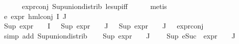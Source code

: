 \begin{isabellebody}
\ \ \ \ \ \ expr{\isacharunderscore}{\kern0pt}{}{\isacharunderscore}{\kern0pt}conj\ Sup{\isacharunderscore}{\kern0pt}union{\isacharunderscore}{\kern0pt}distrib\ le{\isacharunderscore}{\kern0pt}sup{\isacharunderscore}{\kern0pt}iff\isanewline
\ \ \ \ \isamarkupfalse%
\ metis\isanewline
\ \ \isamarkupfalse%
\ e{}{\isacharcolon}{\kern0pt}\ {\isachardoublequoteopen}expr{\isacharunderscore}{\kern0pt}{}\ {\isacharparenleft}{\kern0pt}hml{\isacharunderscore}{\kern0pt}conj\ I\ J\ {\isasymPhi}{\isacharparenright}{\kern0pt}\ {\isasymle}\ {}{\isachardoublequoteclose}\ \isanewline
\ \ \ \ \isamarkupfalse%
\ {\isacartoucheopen}Sup\ {\isacharparenleft}{\kern0pt}{\isacharparenleft}{\kern0pt}expr{\isacharunderscore}{\kern0pt}{}\ {\isasymcirc}\ {\isasymPhi}{\isacharparenright}{\kern0pt}\ {\isacharbackquote}{\kern0pt}\ I{\isacharparenright}{\kern0pt}\ {\isasymle}\ {}{\isacartoucheclose}\ {\isacartoucheopen}Sup\ {\isacharparenleft}{\kern0pt}{\isacharparenleft}{\kern0pt}expr{\isacharunderscore}{\kern0pt}{}\ {\isasymcirc}\ {\isasymPhi}{\isacharparenright}{\kern0pt}\ {\isacharbackquote}{\kern0pt}\ J{\isacharparenright}{\kern0pt}\ {\isasymle}\ {}{\isacartoucheclose}\ {\isacartoucheopen}Sup\ {\isacharparenleft}{\kern0pt}{\isacharparenleft}{\kern0pt}expr{\isacharunderscore}{\kern0pt}{}\ {\isasymcirc}\ {\isasymPhi}{\isacharparenright}{\kern0pt}\ {\isacharbackquote}{\kern0pt}\ J{\isacharparenright}{\kern0pt}\ {\isasymle}\ {}{\isacartoucheclose}\ expr{\isacharunderscore}{\kern0pt}{}{\isacharunderscore}{\kern0pt}conj\ \isanewline
\ \ \ \ \isamarkupfalse%
\ {\isacharparenleft}{\kern0pt}simp\ add{\isacharcolon}{\kern0pt}\ Sup{\isacharunderscore}{\kern0pt}union{\isacharunderscore}{\kern0pt}distrib{\isacharparenright}{\kern0pt}\isanewline
\ \ \isamarkupfalse%
\ {\isacartoucheopen}Sup\ {\isacharparenleft}{\kern0pt}{\isacharparenleft}{\kern0pt}expr{\isacharunderscore}{\kern0pt}{}\ {\isasymcirc}\ {\isasymPhi}{\isacharparenright}{\kern0pt}\ {\isacharbackquote}{\kern0pt}\ J{\isacharparenright}{\kern0pt}\ {\isasymle}\ {}{\isacartoucheclose}\ \isamarkupfalse%
\ {\isachardoublequoteopen}Sup\ {\isacharparenleft}{\kern0pt}{\isacharparenleft}{\kern0pt}eSuc\ {\isasymcirc}\ expr{\isacharunderscore}{\kern0pt}{}\ {\isasymcirc}\ {\isasymPhi}{\isacharparenright}{\kern0pt}\ {\isacharbackquote}{\kern0pt}\ J{\isacharparenright}{\kern0pt}\ {\isasymle}\ {}{\isachardoublequoteclose}\isanewline

\end{isabellebody}
